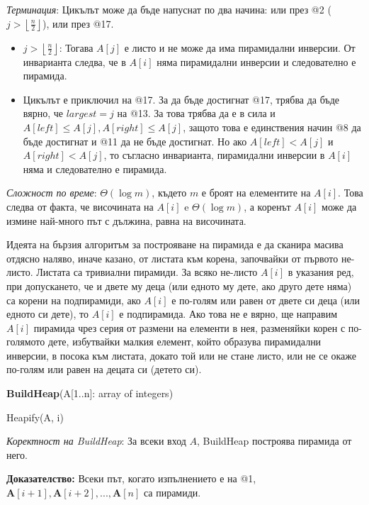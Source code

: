 \documentclass{article}
\renewcommand{\\}{\newline}
\newcommand{\doc}{\textbf{Доказателство: }}
\begin{document}
\textit{Терминация}: Цикълът може да бъде напуснат по два начина: или през @2 (\(j > \left\lfloor \frac{n}{2}\right\rfloor\)), или през @17.

\begin{itemize}
    \item \(j > \left\lfloor \frac{n}{2}\right\rfloor\): Тогава \(A[j]\) е листо и не може да има пирамидални инверсии. От инварианта следва, че в \(A[i]\) няма пирамидални инверсии и следователно е пирамида.   
    \item Цикълът е приключил на @17. За да бъде достигнат @17, трябва да бъде вярно, че \(largest = j\) на @13. За това трябва да е в сила и \(A[left] \leq A[j], A[right] \leq A[j]\), защото това е единствения начин @8 да бъде достигнат и @11 да не бъде достигнат. Но ако \(A[left] < A[j]\) и \(A[right] < A[j]\), то съгласно инварианта, пирамидални инверсии в \(A[i]\) няма и следователно е пирамида.     
\end{itemize}

\textit{Сложност по време}: \(\Theta(\log m)\), където \(m\) е броят на елементите на \(A[i]\). Това следва от факта, че височината на \(A[i]\) e \(\Theta(\log m)\), а коренът \(A[i]\) може да измине най-много път с дължина, равна на височината.      
 

Идеята на бързия алгоритъм за построяване на пирамида е да сканира масива отдясно наляво, иначе казано, от листата към корена, започвайки от първото не-листо. Листата са тривиални пирамиди. За всяко не-листо \(A[i]\) в указания ред, при допускането, че и двете му деца (или едното му дете, ако друго дете няма) са корени на подпирамиди, ако \(A[i]\) е по-голям или равен от двете си деца (или едното си дете), то \(A[i]\) е подпирамида. Ако това не е вярно, ще направим \(A[i]\) пирамида чрез серия от размени на елементи в нея, разменяйки корен с по-голямото дете, избутвайки малкия елемент, който образува пирамидални инверсии, в посока към листата, докато той или не стане листо, или не се окаже по-голям или равен на децата си (детето си).

\textbf{BuildHeap}(A[1..n]: array of integers)
\begin{algorithmic}[1]
    \State Heapify(A, i)
  \EndFor
\end{algorithmic}

\textit{Коректност на BuildHeap}: За всеки вход \(A\), BuildHeap построява пирамида от него. 

\doc Всеки път, когато изпълнението е на @1, \(\textbf{A}[i+1], \textbf{A}[i+2], ..., \textbf{A}[n]\) са пирамиди.
\end{document}
